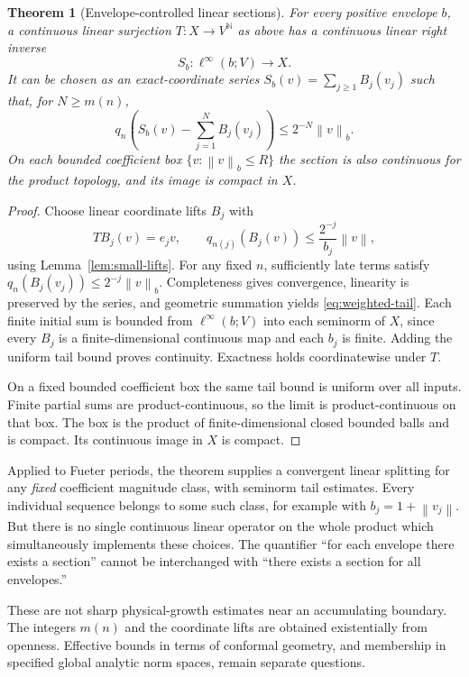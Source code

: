 \documentclass[11pt,a4paper]{article}
\numberwithin{equation}{section}
\newtheorem{theorem}{Theorem}[section]
\theoremstyle{definition}
\theoremstyle{remark}
\newcommand{\N}{\mathbb N}
\newcommand{\norm}[1]{\left\lVert#1\right\rVert}
\begin{document}
\begin{theorem}[Envelope-controlled linear sections]\label{thm:weighted}
For every positive envelope $b$, a continuous linear surjection
$T:X\to V^\N$ as above has a continuous linear right inverse
\[
 S_b:\ell^\infty(b;V)\longrightarrow X.
\]
It can be chosen as an exact-coordinate series
$S_b(v)=\sum_{j\ge1}B_j(v_j)$ such that, for $N\ge m(n)$,
\begin{equation}\label{eq:weighted-tail}
 q_n\!\left(S_b(v)-\sum_{j=1}^N B_j(v_j)\right)
       \le2^{-N}\norm v_b.
\end{equation}
On each bounded coefficient box $\{v:\norm v_b\le R\}$ the section is also
continuous for the product topology, and its image is compact in $X$.
\end{theorem}
\begin{proof}
Choose linear coordinate lifts $B_j$ with
\[
 TB_j(v)=e_jv,\qquad
 q_{n(j)}(B_j(v))\le\frac{2^{-j}}{b_j}\norm v,
\]
using Lemma~\ref{lem:small-lifts}. For any fixed $n$, sufficiently late terms
satisfy $q_n(B_j(v_j))\le2^{-j}\norm v_b$. Completeness gives convergence,
linearity is preserved by the series, and geometric summation yields
\eqref{eq:weighted-tail}. Each finite initial sum is bounded from
$\ell^\infty(b;V)$ into each seminorm of $X$, since every $B_j$ is a
finite-dimensional continuous map and each $b_j$ is finite. Adding the
uniform tail bound proves continuity. Exactness holds coordinatewise under $T$.

On a fixed bounded coefficient box the same tail bound is uniform over all
inputs. Finite partial sums are product-continuous, so the limit is
product-continuous on that box. The box is the product of finite-dimensional
closed bounded balls and is compact. Its continuous image in $X$ is compact.
\end{proof}

Applied to Fueter periods, the theorem supplies a convergent linear splitting
for any \emph{fixed} coefficient magnitude class, with seminorm tail estimates.
Every individual sequence belongs to some such class, for example with
$b_j=1+\norm{v_j}$. But there is no single continuous linear operator on the
whole product which simultaneously implements these choices. The quantifier
``for each envelope there exists a section'' cannot be interchanged with
``there exists a section for all envelopes.''

These are not sharp physical-growth estimates near an accumulating boundary.
The integers $m(n)$ and the coordinate lifts are obtained existentially from
openness. Effective bounds in terms of conformal geometry, and membership in
specified global analytic norm spaces, remain separate questions.
\end{document}
